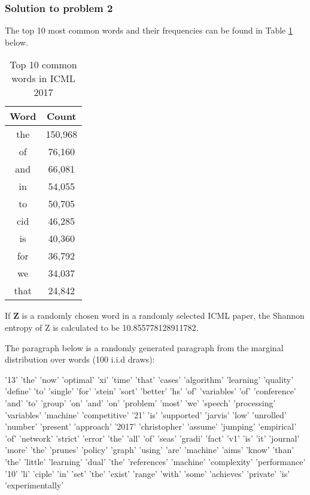 \documentclass[12pt]{article}%
\begin{document}
\subsubsection{Solution to problem 2}
 
The top 10 most common words and their frequencies can be found in Table \ref{table:Q2} below. 

\begin{table}[h]
\centering
\begin{tabular}{|c|c|}
\hline
\textbf{Word} & \textbf{Count} \\ \hline
the           & 150,968         \\ \hline
of            & 76,160          \\ \hline
and           & 66,081          \\ \hline
in            & 54,055          \\ \hline
to            & 50,705          \\ \hline
cid           & 46,285          \\ \hline
is            & 40,360          \\ \hline
for           & 36,792          \\ \hline
we            & 34,037          \\ \hline
that          & 24,842          \\ \hline
\end{tabular}
\caption{Top 10 common words in ICML 2017}
\label{table:Q2}
\end{table}

If \textbf{Z} is a randomly chosen word in a randomly selected ICML paper, the Shannon entropy of Z is calculated to be 10.855778128911782.

The paragraph below is a randomly generated paragraph from the marginal distribution over words (100 i.i.d draws):

\begin{displayquote}
'13' 'the' 'now' 'optimal' 'xi' 'time' 'that' 'cases' 'algorithm' 'learning' 'quality' 'deﬁne' 'to' 'single' 'for' 'stein' 'sort' 'better' 'hs' 'of' 'variables' 'of' 'conference' 'and' 'to' 'group' 'on' 'and' 'on' 'problem' 'most' 'we' 'speech' 'processing' 'variables' 'machine' 'competitive' '21' 'is' 'supported' 'jarvis' 'low' 'unrolled' 'number' 'present' 'approach' '2017' 'christopher' 'assume' 'jumping' 'empirical'  'of' 'network' 'strict' 'error' 'the' 'all' 'of'  'seas' 'gradi' 'fact' 'v1' 'is' 'it' 'journal' 'more' 'the' 'prunes' 'policy' 'graph' 'using' 'are' 'machine' 'aims' 'know' 'than' 'the' 'little' 'learning' 'dual' 'the' 'references' 'machine' 'complexity' 'performance' '10' 'li' 'ciple' 'in' 'set' 'the' 'exist' 'range' 'with' 'some' 'achieves' 'private' 'is' 'experimentally'
\end{displayquote}
\end{document}
